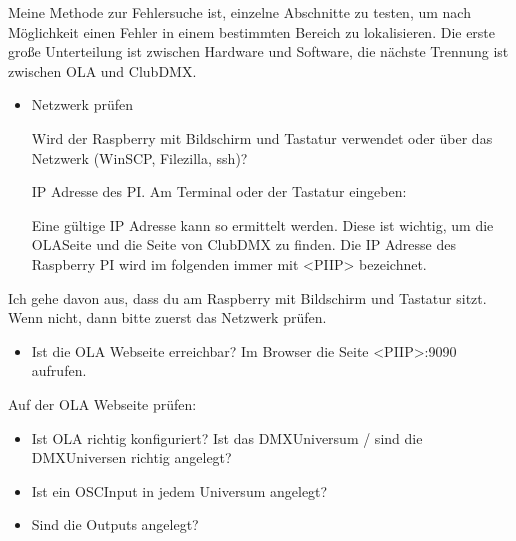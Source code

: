 \documentclass[letterpaper,10pt,ngerman]{sphinxmanual}
\begin{document}
Meine Methode zur Fehlersuche ist, einzelne Abschnitte zu testen, um nach
Möglichkeit einen Fehler in einem bestimmten Bereich zu lokalisieren.
Die erste große Unterteilung ist zwischen Hardware und Software,
die nächste Trennung ist zwischen OLA und ClubDMX.

\begin{itemize}
\item {} 
Netzwerk prüfen

Wird der Raspberry mit Bildschirm und Tastatur verwendet oder über das
Netzwerk (WinSCP, Filezilla, ssh)?

IP Adresse des PI. Am Terminal oder der Tastatur eingeben:


Eine gültige IP Adresse kann so ermittelt werden. Diese ist wichtig, um
die OLA\sphinxhyphen{}Seite und die Seite von ClubDMX zu finden. Die IP Adresse des Raspberry PI
wird im folgenden immer mit \textless{}PI\sphinxhyphen{}IP\textgreater{} bezeichnet.

\end{itemize}


Ich gehe davon aus, dass du am Raspberry mit Bildschirm und Tastatur sitzt.
Wenn nicht, dann bitte zuerst das Netzwerk prüfen.
\begin{itemize}
\item {} 
Ist die OLA Webseite erreichbar?
Im Browser die Seite \textless{}PI\sphinxhyphen{}IP\textgreater{}:9090 aufrufen.

\end{itemize}

Auf der OLA Webseite prüfen:
\begin{itemize}
\item {} 
Ist OLA richtig konfiguriert?
Ist das DMX\sphinxhyphen{}Universum / sind die DMX\sphinxhyphen{}Universen richtig angelegt?

\item {} 
Ist ein OSC\sphinxhyphen{}Input in jedem Universum angelegt?

\item {} 
Sind die Outputs angelegt?

\end{itemize}
\end{document}
